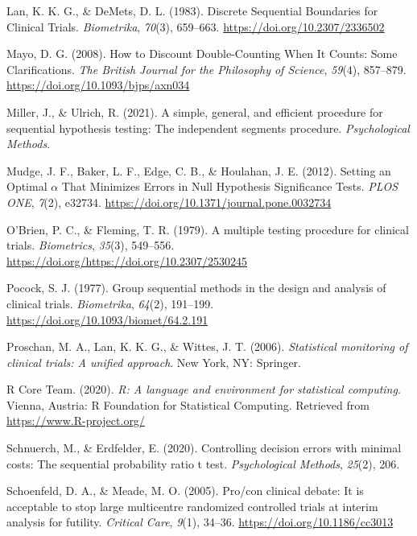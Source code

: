\documentclass[
  english,
  ,man,floatsintext]{apa6}
\newlength{\cslhangindent}
\newenvironment{cslreferences}%
  {\setlength{\parindent}{0pt}%
  \everypar{\setlength{\hangindent}{\cslhangindent}}\ignorespaces}%
  {\par}
\begin{document}
\begin{cslreferences}
\leavevmode\hypertarget{ref-lan_discrete_1983}{}%
Lan, K. K. G., \& DeMets, D. L. (1983). Discrete Sequential Boundaries for Clinical Trials. \emph{Biometrika}, \emph{70}(3), 659--663. \url{https://doi.org/10.2307/2336502}

\leavevmode\hypertarget{ref-mayo_how_2008}{}%
Mayo, D. G. (2008). How to Discount Double-Counting When It Counts: Some Clarifications. \emph{The British Journal for the Philosophy of Science}, \emph{59}(4), 857--879. \url{https://doi.org/10.1093/bjps/axn034}

\leavevmode\hypertarget{ref-miller_simple_2021}{}%
Miller, J., \& Ulrich, R. (2021). A simple, general, and efficient procedure for sequential hypothesis testing: The independent segments procedure. \emph{Psychological Methods}.

\leavevmode\hypertarget{ref-mudge_setting_2012}{}%
Mudge, J. F., Baker, L. F., Edge, C. B., \& Houlahan, J. E. (2012). Setting an Optimal \(\alpha\) That Minimizes Errors in Null Hypothesis Significance Tests. \emph{PLOS ONE}, \emph{7}(2), e32734. \url{https://doi.org/10.1371/journal.pone.0032734}

\leavevmode\hypertarget{ref-obrien_multiple_1979}{}%
O'Brien, P. C., \& Fleming, T. R. (1979). A multiple testing procedure for clinical trials. \emph{Biometrics}, \emph{35}(3), 549--556. \url{https://doi.org/https://doi.org/10.2307/2530245}

\leavevmode\hypertarget{ref-pocock_group_1977}{}%
Pocock, S. J. (1977). Group sequential methods in the design and analysis of clinical trials. \emph{Biometrika}, \emph{64}(2), 191--199. \url{https://doi.org/10.1093/biomet/64.2.191}

\leavevmode\hypertarget{ref-proschan_statistical_2006}{}%
Proschan, M. A., Lan, K. K. G., \& Wittes, J. T. (2006). \emph{Statistical monitoring of clinical trials: A unified approach}. New York, NY: Springer.

\leavevmode\hypertarget{ref-r_2020}{}%
R Core Team. (2020). \emph{R: A language and environment for statistical computing}. Vienna, Austria: R Foundation for Statistical Computing. Retrieved from \url{https://www.R-project.org/}

\leavevmode\hypertarget{ref-schnuerch_controlling_2020}{}%
Schnuerch, M., \& Erdfelder, E. (2020). Controlling decision errors with minimal costs: The sequential probability ratio t test. \emph{Psychological Methods}, \emph{25}(2), 206.

\leavevmode\hypertarget{ref-schoenfeld_procon_2005}{}%
Schoenfeld, D. A., \& Meade, M. O. (2005). Pro/con clinical debate: It is acceptable to stop large multicentre randomized controlled trials at interim analysis for futility. \emph{Critical Care}, \emph{9}(1), 34--36. \url{https://doi.org/10.1186/cc3013}


\end{cslreferences}
\end{document}
